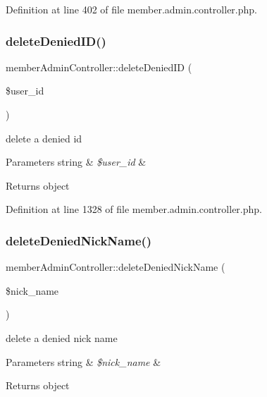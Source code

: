 Definition at line 402 of file member.\+admin.\+controller.\+php.

\mbox{\label{classmemberAdminController_af7f02615adb1cbd7b8b91a330bda1a38}} 
\subsubsection{\texorpdfstring{delete\+Denied\+I\+D()}{deleteDeniedID()}}
{\footnotesize\ttfamily member\+Admin\+Controller\+::delete\+Denied\+ID (\begin{DoxyParamCaption}\item[{}]{\$user\+\_\+id }\end{DoxyParamCaption})}

delete a denied id 
\begin{DoxyParams}[1]{Parameters}
string & {\em \$user\+\_\+id} & \\
\hline
\end{DoxyParams}
\begin{DoxyReturn}{Returns}
object 
\end{DoxyReturn}


Definition at line 1328 of file member.\+admin.\+controller.\+php.

\mbox{\label{classmemberAdminController_a20792ed4ccef3abf09eb3fbd5dd955fb}} 
\subsubsection{\texorpdfstring{delete\+Denied\+Nick\+Name()}{deleteDeniedNickName()}}
{\footnotesize\ttfamily member\+Admin\+Controller\+::delete\+Denied\+Nick\+Name (\begin{DoxyParamCaption}\item[{}]{\$nick\+\_\+name }\end{DoxyParamCaption})}

delete a denied nick name 
\begin{DoxyParams}[1]{Parameters}
string & {\em \$nick\+\_\+name} & \\
\hline
\end{DoxyParams}
\begin{DoxyReturn}{Returns}
object 
\end{DoxyReturn}


